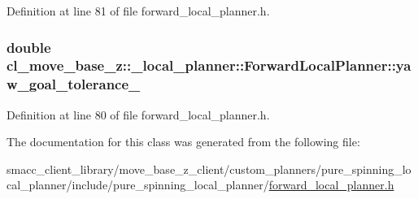 Definition at line 81 of file forward\+\_\+local\+\_\+planner.\+h.

\subsubsection[{\texorpdfstring{yaw\+\_\+goal\+\_\+tolerance\+\_\+}{yaw_goal_tolerance_}}]{\setlength{\rightskip}{0pt plus 5cm}double cl\+\_\+move\+\_\+base\+\_\+z\+::\+\_\+local\+\_\+planner\+::\+Forward\+Local\+Planner\+::yaw\+\_\+goal\+\_\+tolerance\+\_\+\hspace{0.3cm}{\ttfamily [private]}}\hypertarget{classcl__move__base__z_1_1__local__planner_1_1ForwardLocalPlanner_a3f83daf49ca6a0204495d3d6b1ee485b}{}\label{classcl__move__base__z_1_1__local__planner_1_1ForwardLocalPlanner_a3f83daf49ca6a0204495d3d6b1ee485b}


Definition at line 80 of file forward\+\_\+local\+\_\+planner.\+h.



The documentation for this class was generated from the following file\+:\begin{DoxyCompactItemize}
\item 
smacc\+\_\+client\+\_\+library/move\+\_\+base\+\_\+z\+\_\+client/custom\+\_\+planners/pure\+\_\+spinning\+\_\+local\+\_\+planner/include/pure\+\_\+spinning\+\_\+local\+\_\+planner/\hyperlink{pure__spinning__local__planner_2include_2pure__spinning__local__planner_2forward__local__planner_8h}{forward\+\_\+local\+\_\+planner.\+h}\end{DoxyCompactItemize}
